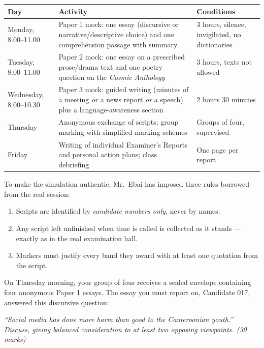 \documentclass[11pt]{article}
\begin{document}
\begin{center}
\begin{tabularx}{\linewidth}{|l|X|X|}
\hline
\rowcolor{popblueL} \textbf{Day} & \textbf{Activity} & \textbf{Conditions} \\
\hline
Monday, 8.00--11.00 & Paper 1 mock: one essay (discursive or narrative/descriptive choice) and one comprehension passage with summary & 3 hours, silence, invigilated, no dictionaries \\
\hline
Tuesday, 8.00--11.00 & Paper 2 mock: one essay on a prescribed prose/drama text and one poetry question on the \emph{Cosmic Anthology} & 3 hours, texts not allowed \\
\hline
Wednesday, 8.00--10.30 & Paper 3 mock: guided writing (minutes of a meeting \emph{or} a news report \emph{or} a speech) plus a language-awareness section & 2 hours 30 minutes \\
\hline
Thursday & Anonymous exchange of scripts; group marking with simplified marking schemes & Groups of four, supervised \\
\hline
Friday & Writing of individual Examiner's Reports and personal action plans; class debriefing & One page per report \\
\hline
\end{tabularx}
\end{center}

To make the simulation authentic, Mr.\ Ebai has imposed three rules borrowed from the real session:

\begin{enumerate}
\item Scripts are identified by \emph{candidate numbers only}, never by names.
\item Any script left unfinished when time is called is collected as it stands — exactly as in the real examination hall.
\item Markers must justify every band they award with at least one quotation from the script.
\end{enumerate}

On Thursday morning, your group of four receives a sealed envelope containing four anonymous Paper 1 essays. The essay you must report on, Candidate 017, answered this discursive question:

\begin{exemplebox}
\emph{``Social media has done more harm than good to the Cameroonian youth.'' Discuss, giving balanced consideration to at least two opposing viewpoints. (30 marks)}
\end{exemplebox}
\end{document}
